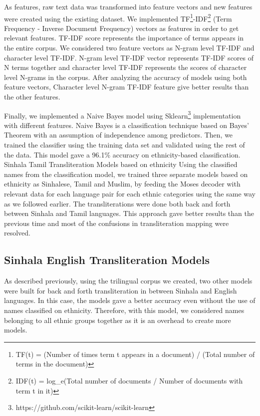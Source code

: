 \documentclass[10pt, a4paper, conference, compsocconf]{IEEEtran}
\begin{document}
As features, raw text data was transformed into feature vectors and new features were created using the existing dataset.  We implemented TF\footnote{TF(t) = (Number of times term t appears in a document) / (Total number of terms in the document)}-IDF\footnote{ IDF(t) = log\_e(Total number of documents / Number of documents with term t in it)} (Term Frequency - Inverse Document Frequency) vectors as features in order to get relevant features. TF-IDF score represents the importance of terms appears in the entire corpus. We considered two feature vectors as N-gram level TF-IDF and character level TF-IDF. N-gram level TF-IDF vector represents TF-IDF scores of N terms together and character level TF-IDF represents the scores of character level N-grams in the corpus. After analyzing the accuracy of models using both feature vectors, Character level N-gram TF-IDF feature give better results than the other features.

Finally, we implemented a Naive Bayes model using Sklearn\footnote{ https://github.com/scikit-learn/scikit-learn} implementation with different features. Naive Bayes is a classification technique based on Bayes’ Theorem with an assumption of independence among predictors.  Then, we trained the classifier using the training data set and validated using the rest of the data. This model gave a 96.1\% accuracy on ethnicity-based classification. 	
Sinhala Tamil Transliteration Models based on ethnicity	
Using the classified names from the classification model, we trained three separate models based on ethnicity as Sinhalese, Tamil and Muslim, by feeding the Moses decoder with relevant data for each language pair for each ethnic categories using the same way as we followed earlier. The transliterations were done both back and forth between Sinhala and Tamil languages. This approach gave better results than the previous time and most of the confusions in transliteration mapping were resolved.
	 	
\subsection {Sinhala English Transliteration Models}
As described previously, using the trilingual corpus we created, two other models were built for back and forth transliteration in between Sinhala and English languages. In this case, the models gave a better accuracy even without the use of names classified on ethnicity. Therefore, with this model, we considered names belonging to all ethnic groups together as it is an overhead to create more models. 	 	
\end{document}

